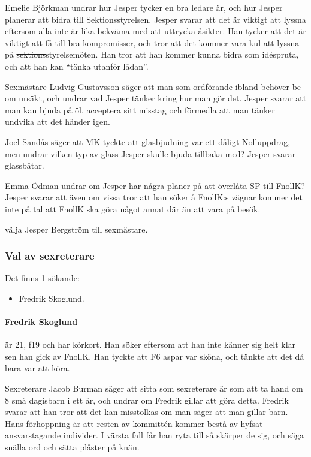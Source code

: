 \documentclass[hidelinks]{sektionsmote}
\begin{document}
Emelie Björkman undrar hur Jesper tycker en bra ledare är, och hur Jesper planerar att bidra till Sektionsstyrelsen.
Jesper svarar att det är viktigt att lyssna eftersom alla inte är lika bekväma med att uttrycka åsikter.
Han tycker att det är viktigt att få till bra kompromisser, och tror att det kommer vara kul att lyssna på \sout{sektions}styrelsemöten.
Han tror att han kommer kunna bidra som idéspruta, och att han kan \enquote{tänka utanför lådan}.

Sexmästare Ludvig Gustavsson säger att man som ordförande ibland behöver be om ursäkt, och undrar vad Jesper tänker kring hur man gör det.
Jesper svarar att man kan bjuda på öl, acceptera sitt misstag och förmedla att man tänker undvika att det händer igen.

Joel Sandås säger att MK tyckte att glasbjudning var ett dåligt Nolluppdrag, men undrar vilken typ av glass Jesper skulle bjuda tillbaka med?
Jesper svarar glassbåtar.

Emma Ödman undrar om Jesper har några planer på att överlåta SP till FnollK?
Jesper svarar att även om vissa tror att han söker å FnollK:s vägnar kommer det inte på tal att FnollK ska göra något annat där än att vara på besök.

\begin{beslut}
  \item välja Jesper Bergström till sexmästare.
\end{beslut}

\subsubsection{Val av sexreterare}
Det finns 1 sökande:
\begin{itemize}
    \item Fredrik Skoglund.
\end{itemize}

\paragraph{Fredrik Skoglund} är 21, f19 och har körkort.
Han söker eftersom att han inte känner sig helt klar sen han gick av FnollK.
Han tyckte att F6 aspar var sköna, och tänkte att det då bara var att köra.

Sexreterare Jacob Burman säger att sitta som sexreterare är som att ta hand om 8 små dagisbarn i ett år, och undrar om Fredrik gillar att göra detta.
Fredrik svarar att han tror att det kan misstolkas om man säger att man gillar barn.
Hans förhoppning är att resten av kommittén kommer bestå av hyfsat ansvarstagande individer.
I värsta fall får han ryta till så skärper de sig, och säga snälla ord och sätta plåster på knän.
\end{document}
